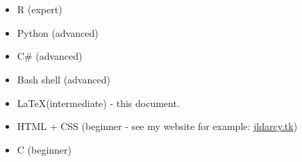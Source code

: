 \documentclass{article}
\begin{document}
\\
\\
\begin{itemize}[noitemsep,topsep=0pt, leftmargin=5mm]
  \item R (expert)
  \item Python (advanced)
  \item C\# (advanced)
  \item Bash shell (advanced)
  \item \LaTeX (intermediate) - this document. 
  \item HTML + CSS (beginner - see my website for example: \url{jldarcy.tk})
  \item C (beginner)
\end{itemize}
\end{document}
